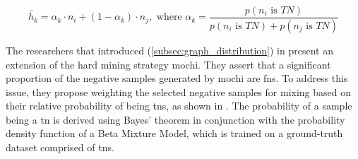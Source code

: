 \begin{equation}
    \tilde{h_k} =  \alpha_k \cdot n_i + (1-\alpha_k) \cdot  n_j, \text{ where } \alpha_k = \frac{p(n_i \text{ is } TN)}{p(n_i \text{ is } TN) + p(n_j \text{ is } TN)}
    \label{eq:progcl_mix}
\end{equation}

The researchers that introduced \progcl{} (\autoref{subsec:graph_distribution}) in \citet{progcl_2022} 
present an extension of the hard mining strategy \ac{mochi}. %
They assert that a significant proportion of the negative samples generated by \ac{mochi} are \acp{fn}.
To address this issue, they propose weighting the selected negative samples for mixing 
based on their relative probability of being  \acp{tn}, as shown in .
The probability of a sample being a \ac{tn} is derived using Bayes' theorem in conjunction with 
the probability density function of a Beta Mixture Model, which is trained on a ground-truth dataset comprised of \acp{tn}.